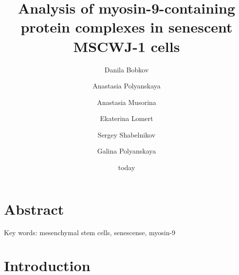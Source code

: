 \documentclass[a4paper,12pt]{article}
\title{Analysis of myosin-9-containing protein complexes in senescent MSCWJ-1 cells}
\begin{document}
\date{today}
\maketitle
\author[1,*]{Danila Bobkov}
\author[2]{Anastasia Polyanskaya}
\author[3]{Anastasia Musorina}
\author[4]{Ekaterina Lomert}
\author[5]{Sergey Shabelnikov}
\author[6]{Galina Polyanskaya}

\section{Abstract}

Key words: mesenchymal stem cells, senescense, myosin-9

\section{Introduction}
\end{document}
